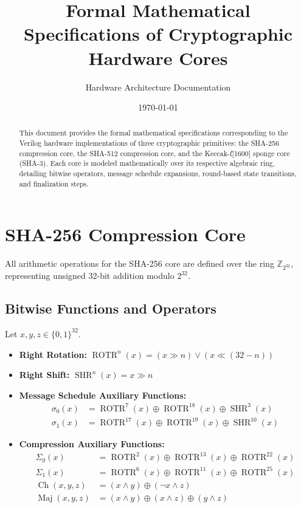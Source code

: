 \documentclass[11pt, a4paper]{article}
\title{\textbf{Formal Mathematical Specifications of Cryptographic Hardware Cores}}
\author{Hardware Architecture Documentation}
\date{\today}
\begin{document}
\maketitle

\begin{abstract}
This document provides the formal mathematical specifications corresponding to the Verilog hardware implementations of three cryptographic primitives: the SHA-256 compression core, the SHA-512 compression core, and the Keccak-f[1600] sponge core (SHA-3). Each core is modeled mathematically over its respective algebraic ring, detailing bitwise operators, message schedule expansions, round-based state transitions, and finalization steps.
\end{abstract}

\section{SHA-256 Compression Core}
All arithmetic operations for the SHA-256 core are defined over the ring $\mathbb{Z}_{2^{32}}$, representing unsigned 32-bit addition modulo $2^{32}$.

\subsection{Bitwise Functions and Operators}
Let $x, y, z \in \{0, 1\}^{32}$.
\begin{itemize}
    \item \textbf{Right Rotation:} $\operatorname{ROTR}^n(x) = (x \gg n) \lor (x \ll (32 - n))$
    \item \textbf{Right Shift:} $\operatorname{SHR}^n(x) = x \gg n$
    \item \textbf{Message Schedule Auxiliary Functions:}
    \begin{align*}
        \sigma_0(x) &= \operatorname{ROTR}^7(x) \oplus \operatorname{ROTR}^{18}(x) \oplus \operatorname{SHR}^3(x) \\
        \sigma_1(x) &= \operatorname{ROTR}^{17}(x) \oplus \operatorname{ROTR}^{19}(x) \oplus \operatorname{SHR}^{10}(x)
    \end{align*}
    \item \textbf{Compression Auxiliary Functions:}
    \begin{align*}
        \Sigma_0(x) &= \operatorname{ROTR}^2(x) \oplus \operatorname{ROTR}^{13}(x) \oplus \operatorname{ROTR}^{22}(x) \\
        \Sigma_1(x) &= \operatorname{ROTR}^6(x) \oplus \operatorname{ROTR}^{11}(x) \oplus \operatorname{ROTR}^{25}(x) \\
        \operatorname{Ch}(x, y, z) &= (x \land y) \oplus (\neg x \land z) \\
        \operatorname{Maj}(x, y, z) &= (x \land y) \oplus (x \land z) \oplus (y \land z)
    \end{align*}
\end{itemize}
\end{document}
